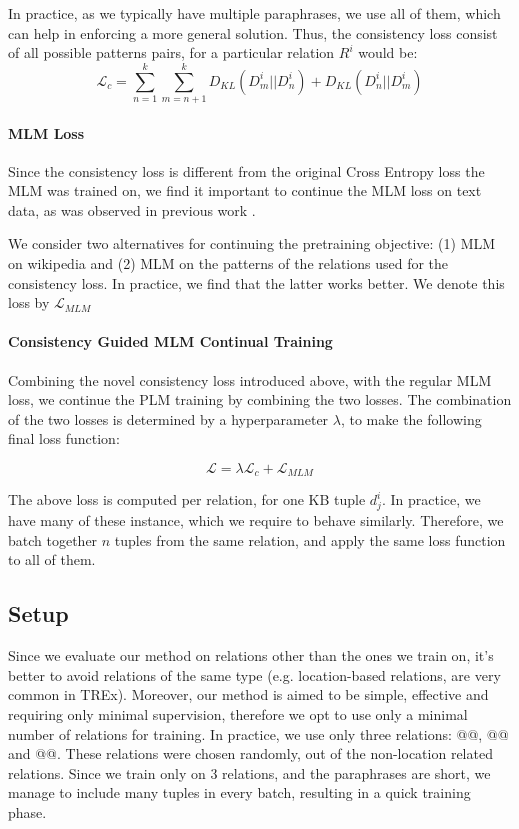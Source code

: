 In practice, as we typically have multiple paraphrases, we use all of them, which can help in enforcing a more general solution. Thus, the consistency loss consist of all possible patterns pairs, for a particular relation $R^i$ would be:
\[
\mathcal{L}_{c} = \sum_{n=1}^k \sum_{m=n+1}^k D_{KL}(D^i_m||D^i_n) + D_{KL}(D^i_n||D^i_m)
\]


\paragraph{MLM Loss}
Since the consistency loss is different from the original Cross Entropy loss the MLM was trained on, we find it important to continue the MLM loss on text data, as was observed in previous work \cite{geva2020injecting}.

We consider two alternatives for continuing the pretraining objective: (1) MLM on wikipedia and (2) MLM on the patterns of the relations used for the consistency loss. In practice, we find that the latter works better. We denote this loss by $\mathcal{L}_{MLM}$


\paragraph{Consistency Guided MLM Continual Training}

Combining the novel consistency loss introduced above, with the regular MLM loss, we continue the PLM training by combining the two losses. The combination of the two losses is determined by a hyperparameter $\lambda$, to make the following final loss function:

\[
\mathcal{L} = \lambda \mathcal{L}_c + \mathcal{L}_{MLM}
\]

The above loss is computed per relation, for one KB tuple $d_j^i$. In practice, we have many of these instance, which we require to behave similarly. Therefore, we batch together $n$ tuples from the same relation, and apply the same loss function to all of them.


\subsection{Setup}

Since we evaluate our method on relations other than the ones we train on, it's better to avoid relations of the same type (e.g. location-based relations, are very common in TREx).
Moreover, our method is aimed to be simple, effective and requiring only minimal supervision, therefore we opt to use only a minimal number of relations for training.
In practice, we use only three relations: @@, @@ and @@. These relations were chosen randomly, out of the non-location related relations.
Since we train only on 3 relations, and the paraphrases are short, we manage to include many tuples in every batch, resulting in a quick training phase.

